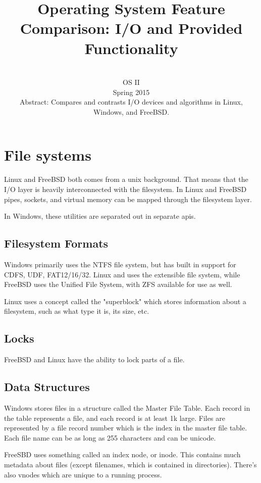 \documentclass[draftclsnofoot,onecolumn]{IEEEtran}
\date{}
\author{\name \\ 
OS II \\
Spring 2015 \\
Abstract: Compares and contrasts I/O devices and algorithms in Linux, Windows, and FreeBSD.
}
\title{Operating System Feature Comparison: I/O and Provided Functionality}
\begin{document}
\maketitle

\pagebreak

\tableofcontents

\pagebreak

\section{File systems}

Linux and FreeBSD both comes from a unix background. That means that the I/O layer is heavily interconnected with the filesystem. In Linux and FreeBSD pipes, sockets, and virtual memory can be mapped through the filesystem layer. 

In Windows, these utilities are separated out in separate apis.

\subsection{Filesystem Formats}

Windows primarily uses the NTFS file system, but has built in support for CDFS, UDF, FAT12/16/32. Linux and uses the extensible file system, while FreeBSD uses the Unified File System, with ZFS available for use as well.

Linux uses a concept called the "superblock" which stores information about a filesystem, such as what type it is, its size, etc.

\subsection{Locks}

FreeBSD and Linux have the ability to lock parts of a file.

\subsection{Data Structures}

Windows stores files in a structure called the Master File Table. Each record in the table represents a file, and each record is at least 1k large. Files are represented by a file record number which is the index in the master file table. Each file name can be as long as 255 characters and can be unicode.

FreeSBD uses something called an index node, or inode. This contains much metadata about files (except filenames, which is contained in directories). There's also vnodes which are unique to a running process.
\end{document}
